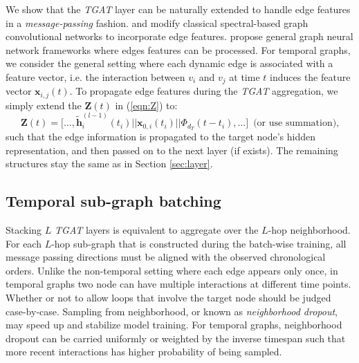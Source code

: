 \documentclass{article} %
\newcommand{\Zbf}{\mathbf{Z}}
\newcommand{\hbf}{\mathbf{h}}
\newcommand{\xbf}{\mathbf{x}}
\begin{document}
We show that the \textsl{TGAT} layer can be naturally extended to handle edge features in a \emph{message-passing} fashion. \cite{simonovsky2017dynamic} and \cite{wang2018dynamic} modify classical spectral-based graph convolutional networks to incorporate edge features. \cite{battaglia2018relational} propose general graph neural network frameworks where edges features can be processed. For temporal graphs, we consider the general setting where each dynamic edge is associated with a feature vector, i.e. the interaction between $v_i$ and $v_j$ at time $t$ induces the feature vector $\xbf_{i,j}(t)$. To propagate edge features during the \textsl{TGAT} aggregation, we simply extend the $\Zbf(t)$ in (\ref{eqn:Z}) to:
\begin{equation}
    \Zbf(t) = \Big[\ldots, \tilde{\hbf}^{(l-1)}_{i}(t_i) || \xbf_{0,i}(t_i) || \Phi_{d_T}(t-t_i) , \ldots  \Big] \, \text{ (or use summation),}
\end{equation}
such that the edge information is propagated to the target node's hidden representation, and then passed on to the next layer (if exists). The remaining structures stay the same as in Section \ref{sec:layer}.


\subsection{Temporal sub-graph batching}
\label{sec:batching}

Stacking $L$ \textsl{TGAT} layers is equivalent to aggregate over the $L$-hop neighborhood. For each $L$-hop sub-graph that is constructed during the batch-wise training, all message passing directions must be aligned with the observed chronological orders. Unlike the non-temporal setting where each edge appears only once, in temporal graphs two node can have multiple interactions at different time points. Whether or not to allow loops that involve the target node should be judged case-by-case. Sampling from neighborhood, or known as \emph{neighborhood dropout}, may speed up and stabilize model training. For temporal graphs, neighborhood dropout can be carried uniformly or weighted by the inverse timespan such that more recent interactions has higher probability of being sampled. 
\end{document}
